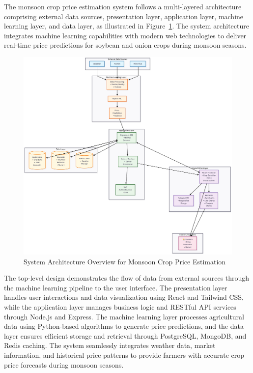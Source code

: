 The monsoon crop price estimation system follows a multi-layered architecture comprising external data sources, presentation layer, application layer, machine learning layer, and data layer, as illustrated in Figure~\ref{fig:system_architecture}. The system architecture integrates machine learning capabilities with modern web technologies to deliver real-time price predictions for soybean and onion crops during monsoon seasons.

\begin{figure}[h]
\centering
\includegraphics[width=\textwidth]{Chapter4/system_architecture.png}
\caption{System Architecture Overview for Monsoon Crop Price Estimation}
\label{fig:system_architecture}
\end{figure}

The top-level design demonstrates the flow of data from external sources through the machine learning pipeline to the user interface. The presentation layer handles user interactions and data visualization using React and Tailwind CSS, while the application layer manages business logic and RESTful API services through Node.js and Express. The machine learning layer processes agricultural data using Python-based algorithms to generate price predictions, and the data layer ensures efficient storage and retrieval through PostgreSQL, MongoDB, and Redis caching. The system seamlessly integrates weather data, market information, and historical price patterns to provide farmers with accurate crop price forecasts during monsoon seasons.

